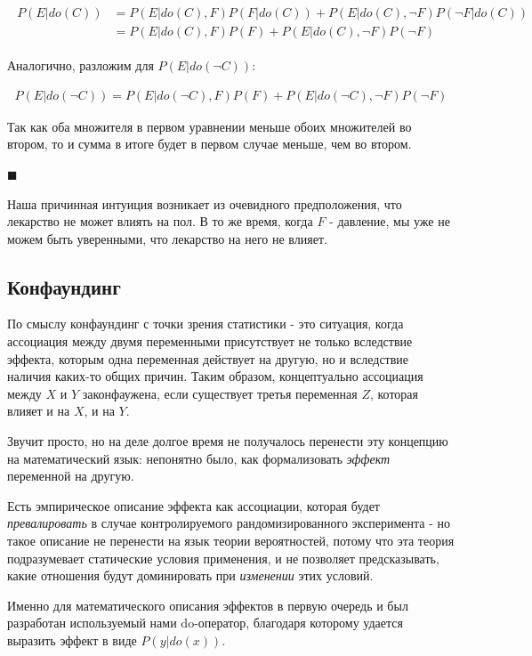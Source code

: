 \documentclass[fleqn]{article}
\numberwithin{equation}{section}
\numberwithin{theorem}{section}
\numberwithin{figure}{section}
\numberwithin{lemma}{section}
\numberwithin{corollary}{section}
\begin{document}
\begin{align}
	\begin{split}
	P(E|do(C)) &= P(E|do(C),F)P(F|do(C)) + P(E|do(C),\neg F)P(\neg F| do(C)) \\
	&= P(E|do(C),F)P(F) + P(E|do(C),\neg F)P(\neg F)
\end{split}
\end{align}

Аналогично, разложим для $P(E|do(\neg C))$:

\begin{align}
	P(E|do(\neg C)) = P(E|do(\neg C),F)P(F) + P(E|do(\neg C),\neg F)P(\neg F)
\end{align}

Так как оба множителя в первом уравнении меньше обоих множителей во втором, то и сумма в итоге будет в первом случае меньше, чем во втором.

$\blacksquare$

Наша причинная интуиция возникает из очевидного предположения, что лекарство не может влиять на пол. В то же время, когда  $F$ - давление, мы уже не можем быть уверенными, что лекарство на него не влияет.

\subsection*{Конфаундинг}

По смыслу конфаундинг с точки зрения статистики - это ситуация, когда ассоциация между двумя переменными присутствует не только вследствие эффекта, которым одна переменная действует на другую, но и вследствие наличия каких-то общих причин. Таким образом, концептуально ассоциация между $X$ и $Y$ законфаужена, если существует третья переменная $Z$, которая влияет и на $X$, и на $Y$.

Звучит просто, но на деле долгое время не получалось перенести эту концепцию на математический язык: непонятно было, как формализовать \textit{эффект} переменной на другую.


Есть эмпирическое описание эффекта как ассоциации, которая будет \textit{превалировать} в случае контролируемого рандомизированного эксперимента - но такое описание не перенести на язык теории вероятностей, потому что эта теория подразумевает статические условия применения, и не позволяет предсказывать, какие отношения будут доминировать при \textit{изменении} этих условий.

Именно для математического описания эффектов в первую очередь и был разработан используемый нами do-оператор, благодаря которому удается выразить эффект в виде $P(y|do(x))$.
\end{document}
